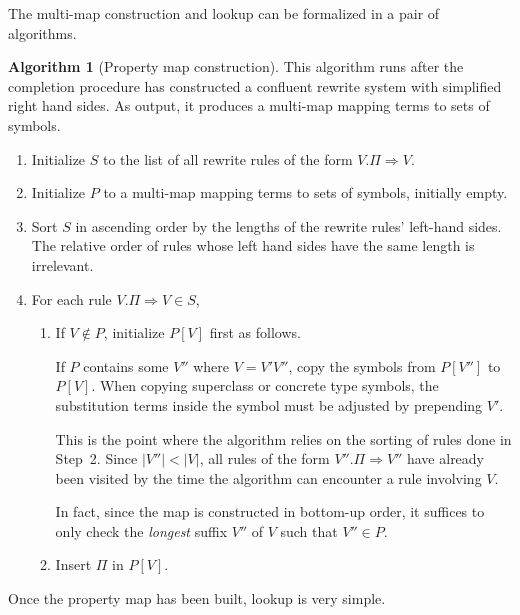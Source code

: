 \documentclass[headsepline,bibliography=totoc]{scrreport}
\theoremstyle{definition}
\theoremstyle{definition}
\theoremstyle{definition}
\newtheorem{algorithm}{Algorithm}[chapter]
\begin{document}
The multi-map construction and lookup can be formalized in a pair of algorithms.
\begin{algorithm}[Property map construction]\label{propmapconsalgo}
This algorithm runs after the completion procedure has constructed a confluent rewrite system with
simplified right hand sides. As output, it produces a multi-map mapping terms to sets of
symbols.

\begin{enumerate}
\item Initialize $S$ to the list of all rewrite rules of the form $V.\Pi\Rightarrow V$.
\item Initialize $P$ to a multi-map mapping terms to sets of symbols, initially empty.
\item Sort $S$ in ascending order by the lengths of the rewrite rules' left-hand sides. The
relative order of rules whose left hand sides have the same length is irrelevant.
\item For each rule $V.\Pi\Rightarrow V\in S$,
\begin{enumerate}
\item If $V\notin P$, initialize $P[V]$ first as follows.

If $P$ contains some $V''$ where $V=V'V''$, copy the symbols from $P[V'']$ to $P[V]$.
When copying superclass or concrete type symbols, the substitution
terms inside the symbol must be adjusted by prepending $V'$.

This is the point where the algorithm relies on the sorting of rules done in Step~2. Since
$|V''|<|V|$, all rules of the form $V''.\Pi\Rightarrow V''$ have already been visited by the time
the algorithm can encounter a rule involving $V$.

In fact, since the map is constructed in
bottom-up order, it suffices to only check the \emph{longest} suffix $V''$ of $V$ such that $V''\in P$.

\item Insert $\Pi$ in $P[V]$.
\end{enumerate}
\end{enumerate}
\end{algorithm}
Once the property map has been built, lookup is very simple.
\end{document}
